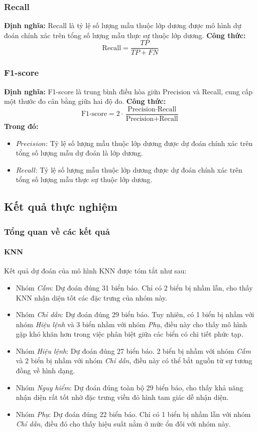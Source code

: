 \documentclass[a4paper,12pt]{article}
\begin{document}
\subsubsection{Recall}
\textbf{Định nghĩa:} Recall là tỷ lệ số lượng mẫu thuộc lớp dương được mô hình dự đoán chính xác trên tổng số lượng mẫu thực sự thuộc lớp dương.  
\textbf{Công thức:}  
\[
\text{Recall} = \frac{TP}{TP + FN}
\]

\subsubsection{F1-score}
\textbf{Định nghĩa:} F1-score là trung bình điều hòa giữa Precision và Recall, cung cấp một thước đo cân bằng giữa hai độ đo.  
\textbf{Công thức:}  
\[
\text{F1-score} = 2 \cdot \frac{\text{Precision} \cdot \text{Recall}}{\text{Precision} + \text{Recall}}
\]
\textbf{Trong đó:}  
\begin{itemize}
    \item \(Precision\): Tỷ lệ số lượng mẫu thuộc lớp dương được dự đoán chính xác trên tổng số lượng mẫu dự đoán là lớp dương.
    \item \(Recall\): Tỷ lệ số lượng mẫu thuộc lớp dương được dự đoán chính xác trên tổng số lượng mẫu thực sự thuộc lớp dương.
\end{itemize}


\newpage
\subsection{Kết quả thực nghiệm}

\subsubsection{Tổng quan về các kết quả}

\paragraph{KNN} 
Kết quả dự đoán của mô hình KNN được tóm tắt như sau:
\begin{itemize}
    \item Nhóm \textit{Cấm}: Dự đoán đúng 31 biển báo. Chỉ có 2 biển bị nhầm lẫn, cho thấy KNN nhận diện tốt các đặc trưng của nhóm này.
    \item Nhóm \textit{Chỉ dẫn}: Dự đoán đúng 29 biển báo. Tuy nhiên, có 1 biển bị nhầm với nhóm \textit{Hiệu lệnh} và 3 biển nhầm với nhóm \textit{Phụ}, điều này cho thấy mô hình gặp khó khăn hơn trong việc phân biệt giữa các biển có chi tiết phức tạp.
    \item Nhóm \textit{Hiệu lệnh}: Dự đoán đúng 27 biển báo. 2 biển bị nhầm với nhóm \textit{Cấm} và 2 biển bị nhầm với nhóm \textit{Chỉ dẫn}, điều này có thể bắt nguồn từ sự tương đồng về hình dạng.
    \item Nhóm \textit{Nguy hiểm}: Dự đoán đúng toàn bộ 29 biển báo, cho thấy khả năng nhận diện rất tốt nhờ đặc trưng viền đỏ hình tam giác dễ nhận diện.
    \item Nhóm \textit{Phụ}: Dự đoán đúng 22 biển báo. Chỉ có 1 biển bị nhầm lẫn với nhóm \textit{Chỉ dẫn}, điều đó cho thấy hiệu suất nằm ở mức ổn đối với nhóm này.
\end{itemize}
\end{document}
